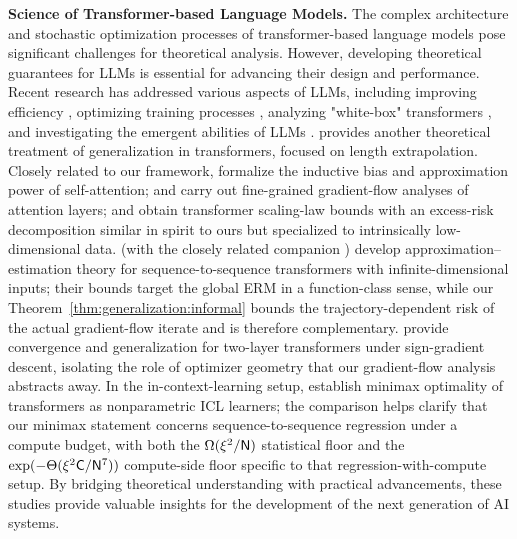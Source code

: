 \documentclass[11pt]{article}
\let\citet\citep
\theoremstyle{plain}
\begin{document}
{\bf Science of Transformer-based Language Models. }
The complex architecture and stochastic optimization processes of transformer-based language models pose significant challenges for theoretical analysis. However, developing theoretical guarantees for LLMs is essential for advancing their design and performance. Recent research has addressed various aspects of LLMs, including improving efficiency \citep{as23, as24_fine_grained, as24_iclr, hjk+23, kmz23, alsy23, dsy24, smn+24, lssy25}, optimizing training processes \citep{dls23, csy24, gll+24}, analyzing "white-box" transformers \citep{ybp+23, yct+23, fsb+24, pbw+24}, and investigating the emergent abilities of LLMs \citep{bmr+20, wtb+22, azl23_physics_a, azl23_physics_b, azl23_physics_c, azl24_physics_d}. \citet{huang2024formal} provides another theoretical treatment of generalization in transformers, focused on length extrapolation. Closely related to our framework, \citet{egkz22} formalize the inductive bias and approximation power of self-attention; \citet{cxl+24} and \citet{nlb24} carry out fine-grained gradient-flow analyses of attention layers; and \citet{havrilla2024understanding} obtain transformer scaling-law bounds with an excess-risk decomposition similar in spirit to ours but specialized to intrinsically low-dimensional data. \citet{ts23_approx_est} (with the closely related companion \citep{ts23_approx_tools}) develop approximation--estimation theory for sequence-to-sequence transformers with infinite-dimensional inputs; their bounds target the global ERM in a function-class sense, while our Theorem~\ref{thm:generalization:informal} bounds the trajectory-dependent risk of the actual gradient-flow iterate and is therefore complementary. \citet{lhh+24_sign_gd} provide convergence and generalization for two-layer transformers under sign-gradient descent, isolating the role of optimizer geometry that our gradient-flow analysis abstracts away. In the in-context-learning setup, \citet{ks24_minimax_icl} establish minimax optimality of transformers as nonparametric ICL learners; the comparison helps clarify that our minimax statement concerns sequence-to-sequence regression under a compute budget, with both the $\Omega(\xi^2/{\sf N})$ statistical floor and the $\exp(-\Theta(\xi^2{\sf C}/{\sf N}^7))$ compute-side floor specific to that regression-with-compute setup. By bridging theoretical understanding with practical advancements, these studies provide valuable insights for the development of the next generation of AI systems.%
\else
\fi
\end{document}
